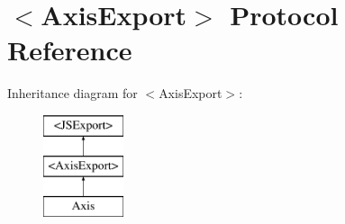 \hypertarget{protocol_axis_export-p}{}\section{$<$Axis\+Export$>$ Protocol Reference}
\label{protocol_axis_export-p}
Inheritance diagram for $<$Axis\+Export$>$\+:\begin{figure}[H]
\begin{center}
\leavevmode
\includegraphics[height=3.000000cm]{protocol_axis_export-p}
\end{center}
\end{figure}
